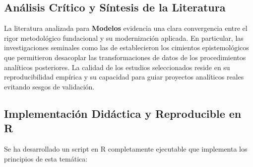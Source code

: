 \subsection{Análisis Crítico y Síntesis de la Literatura}
La literatura analizada para \textbf{Modelos} evidencia una clara convergencia entre el rigor metodológico fundacional y su modernización aplicada. 
En particular, las investigaciones seminales como las de \citeauthor{rich} establecieron los cimientos epistemológicos que permitieron desacoplar las transformaciones de datos de los procedimientos analíticos posteriores. 
La calidad de los estudios seleccionados reside en su reproducibilidad empírica y su capacidad para guiar proyectos analíticos reales evitando sesgos de validación.


\subsection{Implementación Didáctica y Reproducible en R}
Se ha desarrollado un script en R completamente ejecutable que implementa los principios de esta temática:
